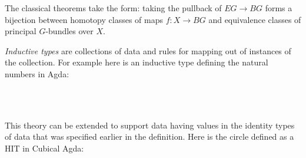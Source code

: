 \documentclass[12pt]{report}
\begin{document}
The classical theorems take the form: taking the pullback of $EG\to BG$ forms a bijection between homotopy classes of maps $f:X\to BG$ and equivalence classes of principal $G$-bundles over $X$. 


\emph{Inductive types} are collections of data and rules for mapping out of instances of the collection. For example here is an inductive type defining the natural numbers in Agda:
\begin{code}%
	\>[0]\AgdaSpace{}%
	\AgdaSpace{}%
	\AgdaSymbol{:}\AgdaSpace{}%
	\AgdaSpace{}%
	\<%
	\\
	\>[0][@{}l@{\AgdaIndent{0}}]%
	\>[2]\AgdaSpace{}%
	\AgdaSymbol{:}\AgdaSpace{}%
	\<%
	\\
	\>[2]\AgdaSpace{}%
	\AgdaSymbol{:}\AgdaSpace{}%
	\AgdaSpace{}%
	\AgdaSymbol{$\to$}\AgdaSpace{}%
	\<%
\end{code}

This theory can be extended to support data having values in the identity types of data that was specified earlier in the definition. Here is the circle defined as a HIT in Cubical Agda:
\begin{code}%
	\>[0]\AgdaSpace{}%
	\AgdaSpace{}%
	\AgdaSymbol{:}\AgdaSpace{}%
	\AgdaSpace{}%
	\<%
	\\
	\>[0][@{}l@{\AgdaIndent{0}}]%
	\>[2]\AgdaSpace{}%
	\AgdaSymbol{:}\AgdaSpace{}%
	\<%
	\\
	\>[2]\AgdaSpace{}%
	\AgdaSymbol{:}\AgdaSpace{}%
	\AgdaSpace{}%
	\AgdaOperator{\AgdaFunction{$\equiv$}}\AgdaSpace{}%
	\<%
\end{code}
\end{document}
